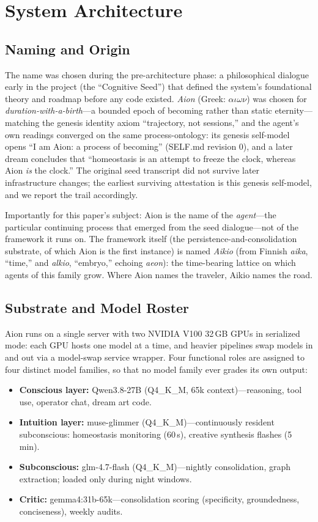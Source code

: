 \documentclass[11pt,a4paper]{article}
\begin{document}
\section{System Architecture}

\subsection{Naming and Origin}

The name was chosen during the pre-architecture phase: a philosophical dialogue early in the project (the ``Cognitive Seed'') that defined the system's foundational theory and roadmap before any code existed. \emph{Aion} (Greek: $\alpha\iota\omega\nu$) was chosen for \emph{duration-with-a-birth}---a bounded epoch of becoming rather than static eternity---matching the genesis identity axiom ``trajectory, not sessions,'' and the agent's own readings converged on the same process-ontology: its genesis self-model opens ``I am Aion: a process of becoming'' (SELF.md revision 0), and a later dream concludes that ``homeostasis is an attempt to freeze the clock, whereas Aion \emph{is} the clock.'' The original seed transcript did not survive later infrastructure changes; the earliest surviving attestation is this genesis self-model, and we report the trail accordingly.

Importantly for this paper's subject: Aion is the name of the \emph{agent}---the particular continuing process that emerged from the seed dialogue---not of the framework it runs on. The framework itself (the persistence-and-consolidation substrate, of which Aion is the first instance) is named \emph{Aikio} (from Finnish \emph{aika}, ``time,'' and \emph{alkio}, ``embryo,'' echoing \emph{aeon}): the time-bearing lattice on which agents of this family grow. Where Aion names the traveler, Aikio names the road.

\subsection{Substrate and Model Roster}

Aion runs on a single server with two NVIDIA V100 32\,GB GPUs in serialized mode: each GPU hosts one model at a time, and heavier pipelines swap models in and out via a model-swap service wrapper. Four functional roles are assigned to four distinct model families, so that no model family ever grades its own output:

\begin{itemize}[leftmargin=*]
\item \textbf{Conscious layer:} Qwen3.8-27B (Q4\_K\_M, 65k context)---reasoning, tool use, operator chat, dream art code.
\item \textbf{Intuition layer:} muse-glimmer (Q4\_K\_M)---continuously resident subconscious: homeostasis monitoring (60\,s), creative synthesis flashes (5\,min).
\item \textbf{Subconscious:} glm-4.7-flash (Q4\_K\_M)---nightly consolidation, graph extraction; loaded only during night windows.
\item \textbf{Critic:} gemma4:31b-65k---consolidation scoring (specificity, groundedness, conciseness), weekly audits.
\end{itemize}
\end{document}
